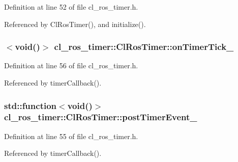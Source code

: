 Definition at line 52 of file cl\+\_\+ros\+\_\+timer.\+h.



Referenced by Cl\+Ros\+Timer(), and initialize().

\subsubsection[{\texorpdfstring{on\+Timer\+Tick\+\_\+}{onTimerTick_}}]{$<$void()$>$ cl\+\_\+ros\+\_\+timer\+::\+Cl\+Ros\+Timer\+::on\+Timer\+Tick\+\_\+\hspace{0.3cm}{\ttfamily [protected]}}\hypertarget{classcl__ros__timer_1_1ClRosTimer_a2fcaab287b6ee13f6cc689876c6d28fa}{}\label{classcl__ros__timer_1_1ClRosTimer_a2fcaab287b6ee13f6cc689876c6d28fa}


Definition at line 56 of file cl\+\_\+ros\+\_\+timer.\+h.



Referenced by timer\+Callback().

\subsubsection[{\texorpdfstring{post\+Timer\+Event\+\_\+}{postTimerEvent_}}]{\setlength{\rightskip}{0pt plus 5cm}std\+::function$<$void()$>$ cl\+\_\+ros\+\_\+timer\+::\+Cl\+Ros\+Timer\+::post\+Timer\+Event\+\_\+\hspace{0.3cm}{\ttfamily [protected]}}\hypertarget{classcl__ros__timer_1_1ClRosTimer_af502ca54355f50d19d4aa6ca5f4e0c23}{}\label{classcl__ros__timer_1_1ClRosTimer_af502ca54355f50d19d4aa6ca5f4e0c23}


Definition at line 55 of file cl\+\_\+ros\+\_\+timer.\+h.



Referenced by timer\+Callback().

